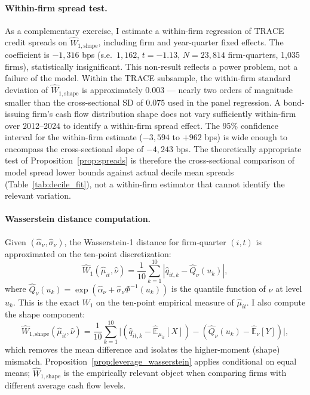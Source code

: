 \paragraph{Within-firm spread test.}
As a complementary exercise, I estimate a within-firm regression of TRACE credit spreads on $\widehat{W}_{1,\text{shape}}$, including firm and year-quarter fixed effects. The coefficient is $-1{,}316$ bps (s.e.\ $1{,}162$, $t = -1.13$, $N = 23{,}814$ firm-quarters, 1,035 firms), statistically insignificant. This non-result reflects a power problem, not a failure of the model. Within the TRACE subsample, the within-firm standard deviation of $\widehat{W}_{1,\text{shape}}$ is approximately $0.003$ — nearly two orders of magnitude smaller than the cross-sectional SD of $0.075$ used in the panel regression. A bond-issuing firm's cash flow distribution shape does not vary sufficiently within-firm over 2012--2024 to identify a within-firm spread effect. The 95\% confidence interval for the within-firm estimate ($-3{,}594$ to $+962$ bps) is wide enough to encompass the cross-sectional slope of $-4{,}243$ bps. The theoretically appropriate test of Proposition~\ref{prop:spreads} is therefore the cross-sectional comparison of model spread lower bounds against actual decile mean spreads (Table~\ref{tab:decile_fit}), not a within-firm estimator that cannot identify the relevant variation.

\paragraph{Wasserstein distance computation.}
Given $(\hat{\alpha}_\nu, \hat{\sigma}_\nu)$, the Wasserstein-1 distance for firm-quarter $(i,t)$ is approximated on the ten-point discretization:
\begin{equation}
  \widehat{W}_1(\hat{\mu}_{it}, \hat{\nu}) = \frac{1}{10}\sum_{k=1}^{10}|\hat{q}_{it,k} - \hat{Q}_\nu(u_k)|,
  \label{eq:w1_approx}
\end{equation}
where $\hat{Q}_\nu(u_k) = \exp(\hat{\alpha}_\nu + \hat{\sigma}_\nu\Phi^{-1}(u_k))$ is the quantile function of $\hat{\nu}$ at level $u_k$. This is the exact $W_1$ on the ten-point empirical measure of $\hat{\mu}_{it}$. I also compute the shape component:
\begin{equation}
  \widehat{W}_{1,\text{shape}}(\hat{\mu}_{it}, \hat{\nu}) = \frac{1}{10}\sum_{k=1}^{10}\bigl|(\hat{q}_{it,k} - \hat{\mathbb{E}}_{\mu_{it}}[X]) - (\hat{Q}_\nu(u_k) - \hat{\mathbb{E}}_\nu[Y])\bigr|,
\end{equation}
which removes the mean difference and isolates the higher-moment (shape) mismatch. Proposition~\ref{prop:leverage_wasserstein} applies conditional on equal means; $\widehat{W}_{1,\text{shape}}$ is the empirically relevant object when comparing firms with different average cash flow levels.

